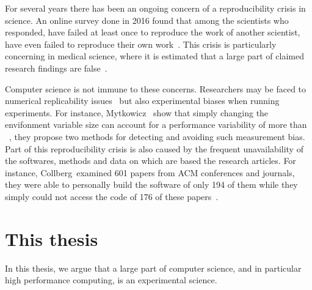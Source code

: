             For several years there has been an ongoing concern of a reproducibility crisis in science. An online survey
            done in 2016 found that among the  scientists who responded,  have failed at least
            once to reproduce the work of another scientist,  have even failed to reproduce their own
            work~\cite{nature_survey}. This crisis is particularly concerning in medical science, where it is estimated that
            a large part of claimed research findings are false~\cite{Ioannidis_2005,freedman}.

            Computer science is not immune to these concerns. Researchers may be faced to numerical replicability
            issues~\cite{Revol_2014} but also experimental biases when running experiments. For instance, Mytkowicz~\etal
            show that simply changing the envifonment variable size can account for a performance variability of more
            than ~\cite{Mytkowicz_2009}, they propose two methods for detecting and avoiding such
            measurement bias. Part of this reproducibility crisis is also caused by the frequent unavailability of the
            softwares, methods and data on which are based the research articles. For instance, Collberg~\etal examined
            601 papers from ACM conferences and journals, they were able to personally build the software
            of only 194 of them while they simply could not access the code of 176 of these
            papers~\cite{collberg2015repeatability}.

    \section{This thesis}%
    \label{sec:this_thesis}

        In this thesis, we argue that a large part of computer science, and in particular high performance computing,
        is an experimental science.


